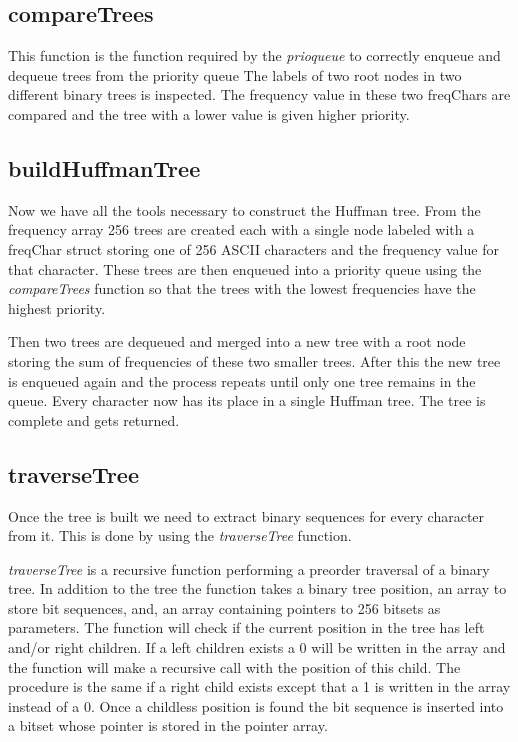 \documentclass[a4paper,11pt,twoside]{article}
\begin{document}
\subsection{compareTrees}
This function is the function required by the \emph{prioqueue} to correctly enqueue and dequeue trees from the priority queue
The labels of two root nodes in two different binary trees is inspected. The frequency value in these two freqChars are compared and the tree with a lower value is given higher priority.
\subsection{buildHuffmanTree}
Now we have all the tools necessary to construct the Huffman tree. From the frequency array 256 trees are created 
each with a single node labeled with a freqChar struct storing one of 256 ASCII characters and the frequency value for that character. These trees are then enqueued into a priority queue using the \emph{compareTrees} function so that the trees with the lowest frequencies have the highest priority. 

Then two trees are dequeued and merged into a new tree with a root node storing the sum of frequencies of these two smaller trees. After this the new tree is enqueued again and the process repeats until only one tree remains in the queue. Every character now has its place in a single Huffman tree. The tree is complete and gets returned.
\subsection{traverseTree}
Once the tree is built we need to extract binary sequences for every character from it. This is done by using the \emph{traverseTree} function. 

\emph{traverseTree} is a recursive function performing a preorder traversal of a binary tree. In addition to the tree the function takes a binary tree position, an array to store bit sequences, and, an array containing pointers to 256 bitsets as parameters. The function will check if the current position in the tree has left and/or right children. If a left children exists a 0 will be written in the array and the function will make a recursive call with the position of this child. The procedure is the same if a right child exists except that a 1 is written in the array instead of a 0. Once a childless position is found the bit sequence is inserted into a bitset whose pointer is stored in the pointer array. 
\end{document}
